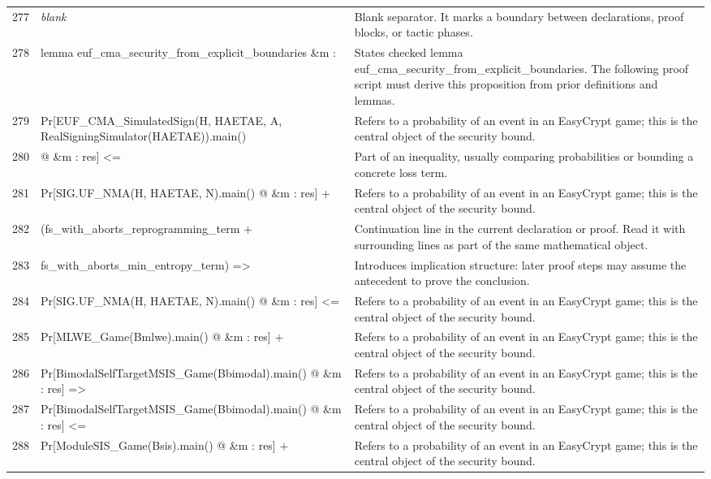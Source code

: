\documentclass[10pt]{article}
\begin{document}
\begin{longtable}{r L{0.53\textwidth} L{0.37\textwidth}}
277 & {\ttfamily\scriptsize \emph{blank}} & Blank separator.  It marks a boundary between declarations, proof blocks, or tactic phases. \\
278 & {\ttfamily\scriptsize lemma euf\_cma\_security\_from\_explicit\_boundaries \&m :} & States checked lemma euf\_cma\_security\_from\_explicit\_boundaries.  The following proof script must derive this proposition from prior definitions and lemmas. \\
279 & {\ttfamily\scriptsize   Pr[EUF\_CMA\_SimulatedSign(H, HAETAE, A, RealSigningSimulator(HAETAE)).main()} & Refers to a probability of an event in an EasyCrypt game; this is the central object of the security bound. \\
280 & {\ttfamily\scriptsize        @ \&m : res] <=} & Part of an inequality, usually comparing probabilities or bounding a concrete loss term. \\
281 & {\ttfamily\scriptsize     Pr[SIG.UF\_NMA(H, HAETAE, N).main() @ \&m : res] +} & Refers to a probability of an event in an EasyCrypt game; this is the central object of the security bound. \\
282 & {\ttfamily\scriptsize     (fs\_with\_aborts\_reprogramming\_term +} & Continuation line in the current declaration or proof.  Read it with surrounding lines as part of the same mathematical object. \\
283 & {\ttfamily\scriptsize       fs\_with\_aborts\_min\_entropy\_term) =>} & Introduces implication structure: later proof steps may assume the antecedent to prove the conclusion. \\
284 & {\ttfamily\scriptsize   Pr[SIG.UF\_NMA(H, HAETAE, N).main() @ \&m : res] <=} & Refers to a probability of an event in an EasyCrypt game; this is the central object of the security bound. \\
285 & {\ttfamily\scriptsize     Pr[MLWE\_Game(Bmlwe).main() @ \&m : res] +} & Refers to a probability of an event in an EasyCrypt game; this is the central object of the security bound. \\
286 & {\ttfamily\scriptsize     Pr[BimodalSelfTargetMSIS\_Game(Bbimodal).main() @ \&m : res] =>} & Refers to a probability of an event in an EasyCrypt game; this is the central object of the security bound. \\
287 & {\ttfamily\scriptsize   Pr[BimodalSelfTargetMSIS\_Game(Bbimodal).main() @ \&m : res] <=} & Refers to a probability of an event in an EasyCrypt game; this is the central object of the security bound. \\
288 & {\ttfamily\scriptsize     Pr[ModuleSIS\_Game(Bsis).main() @ \&m : res] +} & Refers to a probability of an event in an EasyCrypt game; this is the central object of the security bound. \\

\end{longtable}
\end{document}
